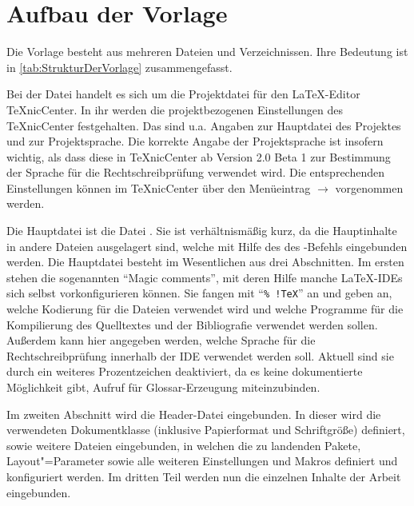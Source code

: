 \section{Aufbau der Vorlage}%
\label{sec:AufbauDerVorlage}
%
Die Vorlage besteht aus mehreren Dateien und Verzeichnissen.
Ihre Bedeutung ist in \cref{tab:StrukturDerVorlage} zusammengefasst.

{%
\footnotesize%
\renewcommand{\arraystretch}{1.5}%
\setlength{\tabcolsep}{0pt}%
%
}%
%
Bei der Datei  handelt es sich um die Projektdatei für den \LaTeX-Editor TeXnicCenter.
In ihr werden die projektbezogenen Einstellungen des TeXnicCenter festgehalten.
Das sind u.a. Angaben zur Hauptdatei des Projektes und zur Projektsprache.
Die korrekte Angabe der Projektsprache ist insofern wichtig, als dass diese in TeXnicCenter ab Version 2.0 Beta 1 zur Bestimmung der Sprache für die Rechtschreibprüfung verwendet wird.
Die entsprechenden Einstellungen können im TeXnicCenter über den Menüeintrag  $\rightarrow$  vorgenommen werden.


Die Hauptdatei ist die Datei .
Sie ist verhältnismäßig kurz, da die Hauptinhalte in andere Dateien ausgelagert sind, welche mit Hilfe des  \bzw des -Befehls eingebunden werden.
Die Hauptdatei besteht im Wesentlichen aus drei Abschnitten.
Im ersten stehen die sogenannten \enquote{Magic comments}, mit deren Hilfe manche \LaTeX-IDEs sich selbst vorkonfigurieren können.
Sie fangen mit \enquote{\texttt{\%~!TeX}} an und geben an, welche Kodierung für die Dateien verwendet wird und welche Programme für die Kompilierung des Quelltextes und der Bibliografie verwendet werden sollen.
Außerdem kann hier angegeben werden, welche Sprache für die Rechtschreibprüfung innerhalb der IDE verwendet werden soll.
Aktuell sind sie durch ein weiteres Prozentzeichen deaktiviert, da es keine dokumentierte Möglichkeit gibt, Aufruf für Glossar-Erzeugung miteinzubinden.

Im zweiten Abschnitt wird die Header-Datei eingebunden.
In dieser wird die verwendeten Dokumentklasse (inklusive Papierformat und Schriftgröße) definiert, sowie weitere Dateien eingebunden,
in welchen die zu landenden Pakete, Layout"=Parameter sowie alle weiteren Einstellungen und Makros definiert und konfiguriert werden.
Im dritten Teil werden nun die einzelnen Inhalte der Arbeit eingebunden.

